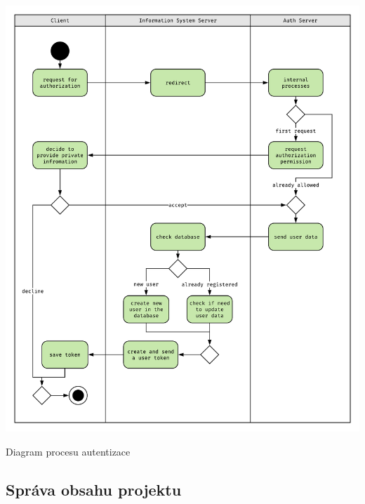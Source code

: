 \begin{fig:illustration}
   \includegraphics[width=1\textwidth]{images/dia-ak-auth.pdf}
   \caption[Diagram procesu autentizace]{Diagram procesu autentizace}\label{pic:dia-ak-auth}
\end{fig:illustration}




\subsection{Správa obsahu projektu}





